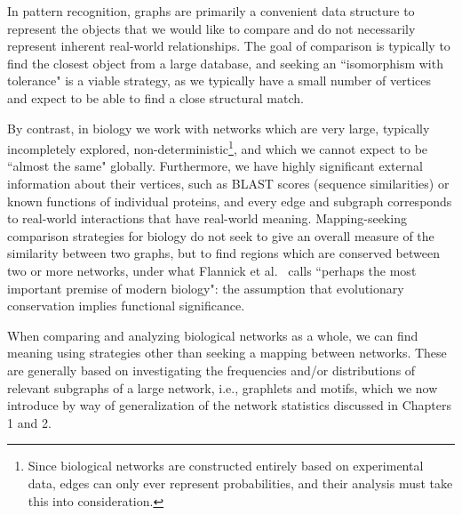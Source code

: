 \documentclass[12pt]{thesis}
\theoremstyle{plain}
\theoremstyle{definition}
\theoremstyle{remark}
\begin{document}
In pattern recognition, graphs are primarily a convenient data structure to represent the objects that we would like to compare and do not necessarily represent inherent real-world relationships. The goal of comparison is typically to find the closest object from a large database, and seeking an ``isomorphism with tolerance" is a viable strategy, as we typically have a small number of vertices and expect to be able to find a close structural match.  

By contrast, in biology we work with networks which are very large, typically incompletely explored, non-deterministic\footnote{Since biological networks are constructed entirely based on experimental data, edges can only ever represent probabilities, and their analysis must take this into consideration.}, and which we cannot expect to be ``almost the same" globally. Furthermore, we have highly significant external information about their vertices, such as BLAST scores (sequence similarities) or known functions of individual proteins, and every edge and subgraph corresponds to real-world interactions that have real-world meaning. Mapping-seeking comparison strategies for biology do not seek to give an overall measure of the similarity between two graphs, but to find regions which are conserved between two or more networks, under what Flannick et al.\ \cite{flannick2006graemlin} calls ``perhaps the most important premise of modern biology": the assumption that evolutionary conservation implies functional significance.

When comparing and analyzing biological networks as a whole, we can find meaning using strategies other than seeking a mapping between networks. These are generally based on investigating the frequencies and/or distributions of relevant subgraphs of a large network, i.e., graphlets and motifs, which we now introduce by way of generalization of the network statistics discussed in Chapters 1 and 2.
\end{document}
